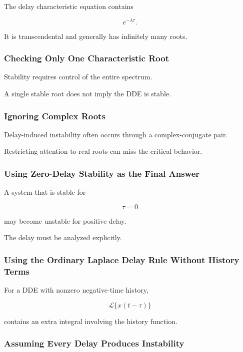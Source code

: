 The delay characteristic equation contains

\[
e^{-\lambda\tau}.
\]

It is transcendental and generally has infinitely many roots.

\subsubsection{Checking Only One Characteristic Root}

Stability requires control of the entire spectrum.

A single stable root does not imply the DDE is stable.

\subsubsection{Ignoring Complex Roots}

Delay-induced instability often occurs through a complex-conjugate pair.

Restricting attention to real roots can miss the critical behavior.

\subsubsection{Using Zero-Delay Stability as the Final Answer}

A system that is stable for

\[
\tau=0
\]

may become unstable for positive delay.

The delay must be analyzed explicitly.

\subsubsection{Using the Ordinary Laplace Delay Rule Without History Terms}

For a DDE with nonzero negative-time history,

\[
\mathcal{L}\{x(t-\tau)\}
\]

contains an extra integral involving the history function.

\subsubsection{Assuming Every Delay Produces Instability}

